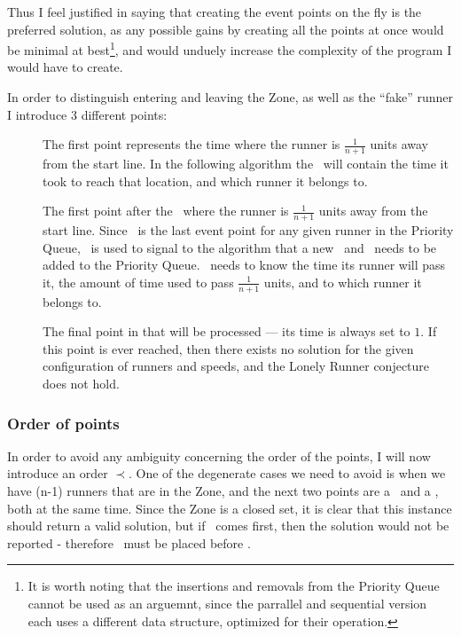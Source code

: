 Thus I feel justified in saying that creating the event points on the fly is the preferred solution, as any possible gains by creating all the points at once would be minimal at best\footnote{It is worth noting that the insertions and removals from the Priority Queue cannot be used as an arguemnt, since the parrallel and sequential version each uses a different data structure, optimized for their operation.}, and would unduely increase the complexity of the program I would have to create. 

In order to distinguish entering and leaving the Zone, as well as the ``fake'' runner I introduce 3 different points:
\begin{description}
\item[\comStart] The first point represents the time where the runner is $\frac{1}{n + 1}$ units away from the start line. In the following algorithm the \comStart\, will contain the time it took to reach that location, and which runner it belongs to.
\item[\comEnd] The first point after the \comStart\, where the runner is $\frac{1}{n + 1}$ units away from the start line. Since \comEnd\, is the last event point for any given runner in the Priority Queue, \comEnd\, is used to signal to the algorithm that a new \comStart\, and \comEnd\, needs to be added to the Priority Queue. \comEnd\, needs to know the time its runner will pass it, the amount of time used to pass $\frac{1}{n+1}$ units, and to which runner it belongs to.
\item[\comFin] The final point in that will be processed --- its time is always set to $1$. If this point is ever reached, then there exists no solution for the given configuration of runners and speeds, and the Lonely Runner conjecture does not hold.
\end{description}

\subsubsection{Order of points}
In order to avoid any ambiguity concerning the order of the points, I will now introduce an order $\prec$. One of the degenerate cases we need to avoid is when we have (n-1) runners that are in the Zone, and the next two points are a \comEnd\, and a \comStart, both at the same time. Since the Zone is a closed set, it is clear that this instance should return a valid solution, but if \comEnd\, comes first, then the solution would not be reported - therefore \comStart\, must be placed before \comEnd. 

